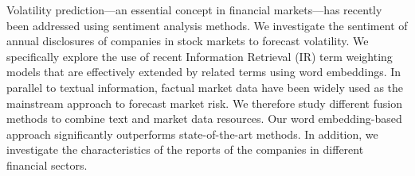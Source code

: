 Volatility prediction—an essential concept in financial markets—has recently been addressed using sentiment analysis methods. We investigate the sentiment of annual disclosures of companies in stock markets to forecast volatility. We specifically explore the use of recent Information Retrieval (IR) term weighting models that are effectively extended by related terms using word embeddings. In parallel to textual information, factual market data have been widely used as the mainstream approach to forecast market risk. We therefore study different fusion methods to combine text and market data resources. Our word embedding-based approach significantly outperforms state-of-the-art methods. In addition, we investigate the characteristics of the reports of the companies in different financial sectors.
